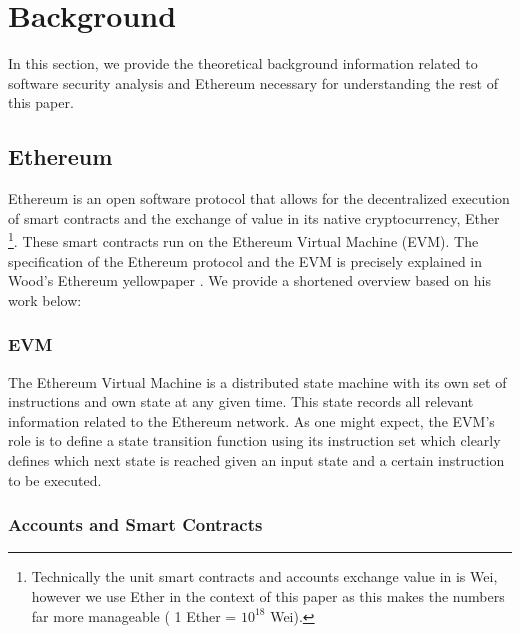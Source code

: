 \documentclass[letterpaper,twocolumn,10pt]{article}
\begin{document}
\section{Background}
In this section, we provide the theoretical background information related to software security analysis and Ethereum necessary for understanding the rest of this paper.

\subsection{Ethereum}
Ethereum is an open software protocol that allows for the decentralized execution of smart contracts and the exchange of value in its native cryptocurrency, Ether \footnote{Technically the unit smart contracts and accounts exchange value in is Wei, however we use Ether in the context of this paper as this makes the numbers far more manageable ( 1 Ether = $10^{18}$ Wei). }.  These smart contracts run on the Ethereum Virtual Machine (EVM). The specification of the Ethereum protocol and the EVM is precisely explained in Wood's Ethereum yellowpaper \cite{wood_2021}. We provide a shortened overview based on his work below:

\subsubsection{EVM}

The Ethereum Virtual Machine is a distributed state machine with its own set of instructions and own state at any given time. This state records all relevant information related to the Ethereum network. As one might expect, the EVM's role is to define a state transition function using its instruction set which clearly defines which next state is reached given an input state and a certain instruction to be executed.

\subsubsection{Accounts and Smart Contracts}
\end{document}
